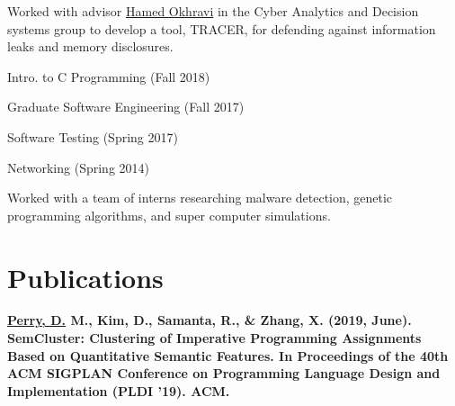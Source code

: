 \documentclass[]{deedy-resume-openfont}
\begin{document}
\vspace{.05in} %
Worked with advisor \href{https://www.ll.mit.edu/biographies/hamed-okhravi}{Hamed Okhravi}
in the Cyber Analytics and Decision systems group to
develop a tool, TRACER, for defending against information leaks and memory disclosures.
\sectionsep

\begin{tightemize}
	\item Intro. to C Programming (Fall 2018) 
	\item Graduate Software Engineering (Fall 2017)
	\item Software Testing (Spring 2017)
	\item Networking (Spring 2014)
\end{tightemize}
\sectionsep

Worked with a team of interns researching malware detection,
genetic programming
algorithms, and super computer simulations.
\sectionsep



\section{Publications}

{\fontsize{10pt}{12pt}\selectfont\bfseries \underline{Perry, D.} M., Kim, D., Samanta, R., \& Zhang, X. (2019, June). 
SemCluster: Clustering of Imperative Programming
Assignments Based on Quantitative Semantic Features. In Proceedings of the 40th ACM SIGPLAN Conference on Programming
Language Design and Implementation (PLDI ’19). ACM.}
\end{document}
